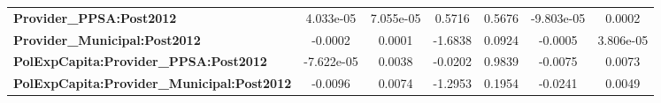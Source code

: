 \begin{center}
\begin{tabular}{lcccccc}
\textbf{Provider\_PPSA:Post2012}                   &     4.033e-05      &     7.055e-05      &      0.5716     &      0.5676      &     -9.803e-05    &       0.0002       \\
\textbf{Provider\_Municipal:Post2012}              &      -0.0002       &       0.0001       &     -1.6838     &      0.0924      &      -0.0005      &     3.806e-05      \\
\textbf{PolExpCapita:Provider\_PPSA:Post2012}      &     -7.622e-05     &       0.0038       &     -0.0202     &      0.9839      &      -0.0075      &       0.0073       \\
\textbf{PolExpCapita:Provider\_Municipal:Post2012} &      -0.0096       &       0.0074       &     -1.2953     &      0.1954      &      -0.0241      &       0.0049       \\
\bottomrule
\end{tabular}
\end{center}